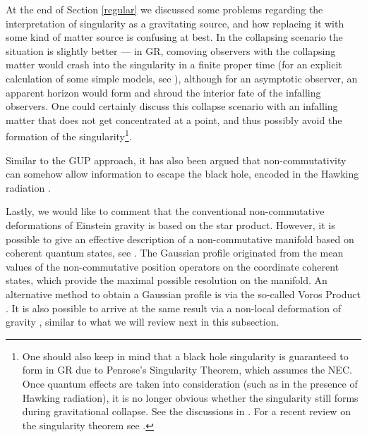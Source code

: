 \documentclass[12pt]{article}
\newcommand{\2}{$^2$}
\newcommand{\3}{$^3$}
\newcommand{\4}{$_4$}
\newcommand{\5}{$_5$}
\begin{document}
\begin{description}

At the end of Section \ref{regular} we discussed some problems regarding the interpretation of singularity as a gravitating source, and how replacing it with some kind of matter source is confusing at best. In the collapsing scenario the situation is slightly better --- in GR, comoving observers with the collapsing matter would crash into the singularity in a finite proper time (for an explicit calculation of some simple models, see \cite{ABCL}), although for an asymptotic observer, an apparent horizon would form and shroud the interior fate of the infalling observers. One could certainly discuss this collapse scenario with an infalling matter that does not get concentrated at a point, and thus possibly avoid the formation of the singularity\footnote{One should also keep in mind that a black hole singularity is guaranteed to form in GR due to Penrose's Singularity Theorem, which assumes the NEC. Once quantum effects are taken into consideration (such as in the presence of Hawking radiation), it is no longer obvious whether the singularity still forms during gravitational collapse. See the discussions in \cite{9506052,1012.6038}. For a recent review on the singularity theorem see \cite{Senovilla-Garfinkle}.}.  

Similar to the GUP approach, it has also been argued that non-commutativity can somehow allow information to escape the black hole, encoded in the Hawking radiation \cite{1312.3032}. 

{\color{black}Lastly, we would like to comment that the conventional non-commutative deformations of
Einstein gravity is based on the star product. However, it is possible to give an effective description of a non-commutative manifold based on coherent quantum states, see \cite{0406174}. The Gaussian profile originated from the mean values of the non-commutative position operators on the
coordinate coherent states, which provide the maximal possible resolution on the manifold. An alternative method to obtain a Gaussian profile is via the so-called Voros Product \cite{0911.2123}. It is also possible to arrive at the same result via a non-local deformation of gravity \cite{1010.0680}, similar to what we will review next in this subsection.} 



\end{description}
\end{document}
